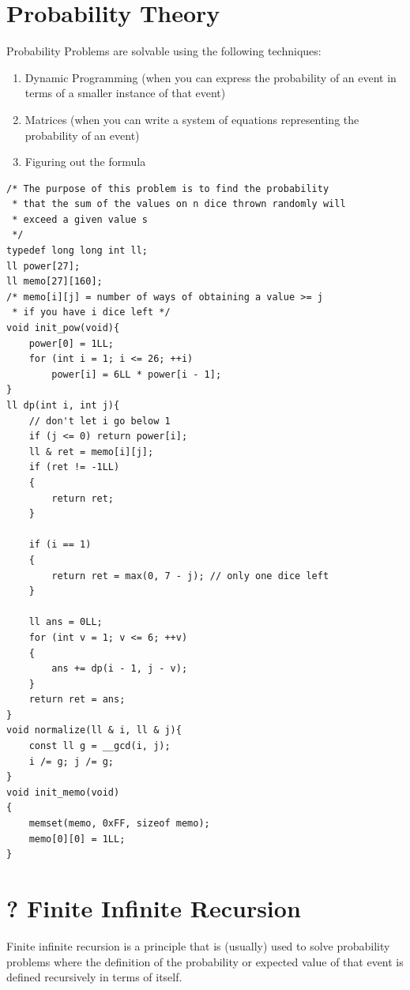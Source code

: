 \documentclass[12pt]{book}
\begin{document}
\section{Probability Theory}
Probability Problems are solvable using the following techniques:
\begin{enumerate}[label = \roman*.]
\item Dynamic Programming (when you can express the probability of an event in terms of a smaller instance of that event)
\item Matrices (when you can write a system of equations representing the probability of an event)
\item Figuring out the formula
\end{enumerate}
\begin{verbatim}
/* The purpose of this problem is to find the probability
 * that the sum of the values on n dice thrown randomly will
 * exceed a given value s
 */
typedef long long int ll;
ll power[27];
ll memo[27][160];
/* memo[i][j] = number of ways of obtaining a value >= j
 * if you have i dice left */
void init_pow(void){
	power[0] = 1LL;
	for (int i = 1; i <= 26; ++i)
		power[i] = 6LL * power[i - 1];
}
ll dp(int i, int j){
	// don't let i go below 1
	if (j <= 0) return power[i];
	ll & ret = memo[i][j];
	if (ret != -1LL)
	{
		return ret;
	}
	
	if (i == 1)
	{
		return ret = max(0, 7 - j);	// only one dice left
	}
	
	ll ans = 0LL;
	for (int v = 1; v <= 6; ++v)
	{
		ans += dp(i - 1, j - v);
	}
	return ret = ans;
}
void normalize(ll & i, ll & j){
	const ll g = __gcd(i, j);
	i /= g; j /= g;
}
void init_memo(void)
{
	memset(memo, 0xFF, sizeof memo);
	memo[0][0] = 1LL;
}
\end{verbatim}
\section{? Finite Infinite Recursion}
Finite infinite recursion is a principle that is (usually) used to solve probability problems where the definition of the probability or expected value of that event is defined recursively in terms of itself.
\end{document}
